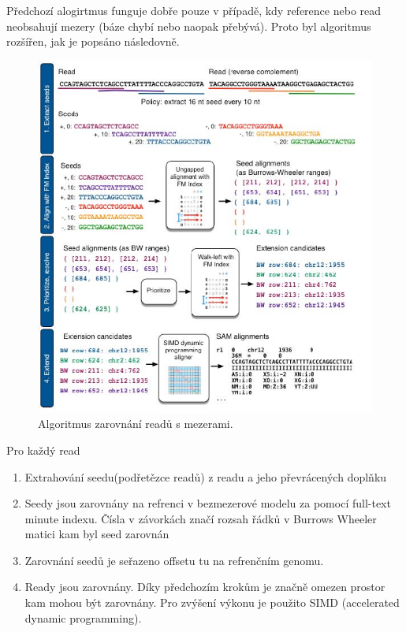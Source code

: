 \documentclass[czech,DP]{thesiskiv}
\numberwithin{equation}{section}
\begin{document}
Předchozí alogirtmus funguje dobře pouze v případě, kdy reference nebo read neobsahují mezery (báze chybí nebo naopak přebývá). Proto byl algoritmus rozšířen, jak je popsáno následovně.

\begin{figure}[H]		
		\centering
		\includegraphics[width=1\textwidth]{./img/bowtie2_postup.png}
		\caption{Algoritmus zarovnání readů s mezerami. \cite{bowtie2}}
		\label{fig:bowtie_postup}
\end{figure}


\noindent
Pro každý read
\begin{enumerate}
	\item Extrahování seedu(podřetězce readů) z readu a jeho převrácených doplňku 
	\item Seedy jsou zarovnány na refrenci v bezmezerové modelu za pomocí full-text minute indexu. Čísla v závorkách značí rozsah řádků v Burrows Wheeler matici kam byl seed zarovnán
	\item Zarovnání seedů je seřazeno offsetu tu na refrenčním genomu.
	\item Ready jsou zarovnány. Díky předchozím krokům je značně omezen prostor kam mohou být zarovnány. Pro zvýšení výkonu je použito SIMD (accelerated dynamic programming).
\end{enumerate}
  
\end{document}
